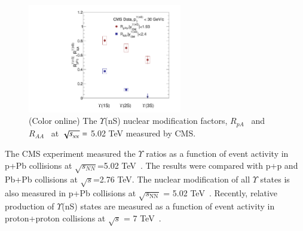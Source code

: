 \begin{figure}
\centering
  \includegraphics[width=0.60\textwidth]{Figures/Fig14_LHC_YnSRPPbRAAInt.pdf}
  \caption{(Color online) The $\Upsilon$(nS) nuclear modification factors,
    $R_{pA}$~\cite{CMS:2022wfi} and $R_{AA}$~\cite{CMS:2018zza}
    at $\sqrt{s_{_{NN}}} =$ 5.02 TeV measured by CMS.
  }
 \label{fig:LHCpBPbPb}
\end{figure}


The CMS experiment measured the $\Upsilon$ ratios as a function of event activity  
in p+Pb collisions at $\sqrt{s_{NN}}$=5.02 TeV~\cite{CMS:2013jsu}.
The results were compared with p+p and Pb+Pb collisions at $\sqrt{s}$=2.76 TeV.
 The nuclear modification of all $\Upsilon$ states is also measured in p+Pb collisions
 at $\sqrt{s_\mathrm{NN}}$ = 5.02 TeV~\cite{CMS:2022wfi}.
 Recently, relative production of $\Upsilon$(nS) states are measured as a function of
 event activity in proton+proton collisions at $ \sqrt{s} $ = 7 TeV~\cite{CMS:2020fae}.

